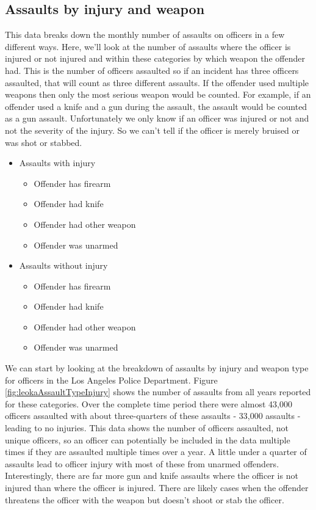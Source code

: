 \documentclass[
  12pt,
  openany]{book}
\providecommand{\tightlist}{%
  \setlength{\itemsep}{0pt}\setlength{\parskip}{0pt}}
\begin{document}
\subsection{Assaults by injury and weapon}\label{assaults-by-injury-and-weapon}

This data breaks down the monthly number of assaults on officers in a few different ways. Here, we'll look at the number of assaults where the officer is injured or not injured and within these categories by which weapon the offender had. This is the number of officers assaulted so if an incident has three officers assaulted, that will count as three different assaults. If the offender used multiple weapons then only the most serious weapon would be counted. For example, if an offender used a knife and a gun during the assault, the assault would be counted as a gun assault. Unfortunately we only know if an officer was injured or not and not the severity of the injury. So we can't tell if the officer is merely bruised or was shot or stabbed.

\begin{itemize}
\tightlist
\item
  Assaults with injury

  \begin{itemize}
  \tightlist
  \item
    Offender has firearm
  \item
    Offender had knife
  \item
    Offender had other weapon
  \item
    Offender was unarmed
  \end{itemize}
\item
  Assaults without injury

  \begin{itemize}
  \tightlist
  \item
    Offender has firearm
  \item
    Offender had knife
  \item
    Offender had other weapon
  \item
    Offender was unarmed
  \end{itemize}
\end{itemize}

We can start by looking at the breakdown of assaults by injury and weapon type for officers in the Los Angeles Police Department. Figure \ref{fig:leokaAssaultTypeInjury} shows the number of assaults from all years reported for these categories. Over the complete time period there were almost 43,000 officers assaulted with about three-quarters of these assaults - 33,000 assaults - leading to no injuries. This data shows the number of officers assaulted, not unique officers, so an officer can potentially be included in the data multiple times if they are assaulted multiple times over a year. A little under a quarter of assaults lead to officer injury with most of these from unarmed offenders. Interestingly, there are far more gun and knife assaults where the officer is not injured than where the officer is injured. There are likely cases when the offender threatens the officer with the weapon but doesn't shoot or stab the officer.
\end{document}
